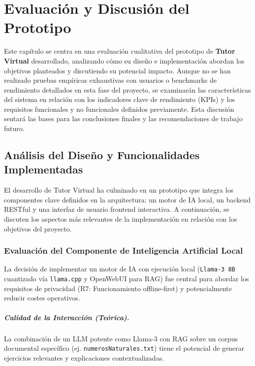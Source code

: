 \chapter{Evaluación y Discusión del Prototipo}
\label{chap:evaluacion_discusion}
\justifying

Este capítulo se centra en una evaluación cualitativa del prototipo de \textbf{Tutor Virtual} desarrollado, analizando cómo su diseño e implementación abordan los objetivos planteados y discutiendo su potencial impacto. Aunque no se han realizado pruebas empíricas exhaustivas con usuarios o benchmarks de rendimiento detallados en esta fase del proyecto, se examinarán las características del sistema en relación con los indicadores clave de rendimiento (KPIs) y los requisitos funcionales y no funcionales definidos previamente. Esta discusión sentará las bases para las conclusiones finales y las recomendaciones de trabajo futuro.

\section{Análisis del Diseño y Funcionalidades Implementadas}
\label{sec:eval_analisis_diseno}

El desarrollo de Tutor Virtual ha culminado en un prototipo que integra los componentes clave definidos en la arquitectura: un motor de IA local, un backend RESTful y una interfaz de usuario frontend interactiva. A continuación, se discuten los aspectos más relevantes de la implementación en relación con los objetivos del proyecto.

\subsection{Evaluación del Componente de Inteligencia Artificial Local}
\label{ssec:eval_ia_local}

La decisión de implementar un motor de IA con ejecución local (\texttt{Llama-3 8B} cuantizado vía \texttt{llama.cpp} y OpenWebUI para RAG) fue central para abordar los requisitos de privacidad (R7: Funcionamiento offline-first) y potencialmente reducir costes operativos.

\paragraph{Calidad de la Interacción (Teórica).}
La combinación de un LLM potente como Llama-3 con RAG sobre un corpus documental específico (ej. \texttt{numerosNaturales.txt}) tiene el potencial de generar ejercicios relevantes y explicaciones contextualizadas.

